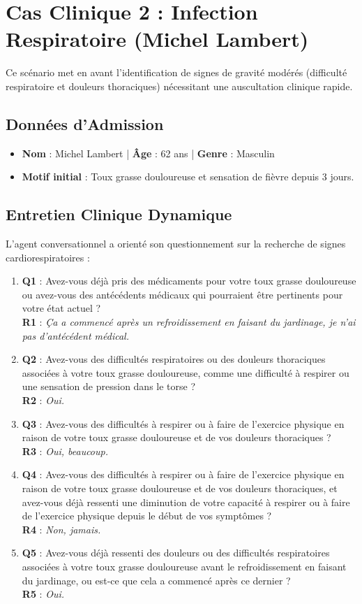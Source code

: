 \documentclass[11pt,a4paper]{report}
\begin{document}
\newpage
\section{Cas Clinique 2 : Infection Respiratoire (Michel Lambert)}
Ce scénario met en avant l'identification de signes de gravité modérés (difficulté respiratoire et douleurs thoraciques) nécessitant une auscultation clinique rapide.

\subsection{Données d'Admission}
\begin{itemize}
    \item \textbf{Nom} : Michel Lambert | \textbf{Âge} : 62 ans | \textbf{Genre} : Masculin
    \item \textbf{Motif initial} : Toux grasse douloureuse et sensation de fièvre depuis 3 jours.
\end{itemize}

\subsection{Entretien Clinique Dynamique}
L'agent conversationnel a orienté son questionnement sur la recherche de signes cardiorespiratoires :
\begin{enumerate}
    \item \textbf{Q1} : Avez-vous déjà pris des médicaments pour votre toux grasse douloureuse ou avez-vous des antécédents médicaux qui pourraient être pertinents pour votre état actuel ?
    \\ \textbf{R1} : \textit{Ça a commencé après un refroidissement en faisant du jardinage, je n'ai pas d'antécédent médical.}
    \item \textbf{Q2} : Avez-vous des difficultés respiratoires ou des douleurs thoraciques associées à votre toux grasse douloureuse, comme une difficulté à respirer ou une sensation de pression dans le torse ?
    \\ \textbf{R2} : \textit{Oui.}
    \item \textbf{Q3} : Avez-vous des difficultés à respirer ou à faire de l'exercice physique en raison de votre toux grasse douloureuse et de vos douleurs thoraciques ?
    \\ \textbf{R3} : \textit{Oui, beaucoup.}
    \item \textbf{Q4} : Avez-vous des difficultés à respirer ou à faire de l'exercice physique en raison de votre toux grasse douloureuse et de vos douleurs thoraciques, et avez-vous déjà ressenti une diminution de votre capacité à respirer ou à faire de l'exercice physique depuis le début de vos symptômes ?
    \\ \textbf{R4} : \textit{Non, jamais.}
    \item \textbf{Q5} : Avez-vous déjà ressenti des douleurs ou des difficultés respiratoires associées à votre toux grasse douloureuse avant le refroidissement en faisant du jardinage, ou est-ce que cela a commencé après ce dernier ?
    \\ \textbf{R5} : \textit{Oui.}
\end{enumerate}
\end{document}
